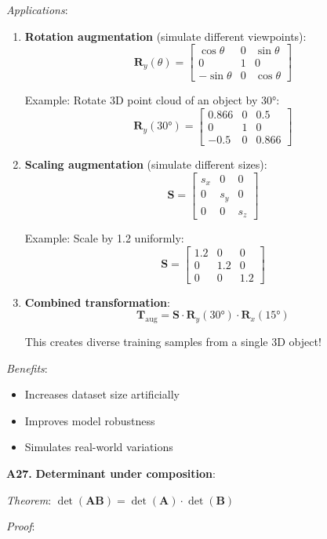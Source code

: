 \documentclass[12pt,a4paper]{article}
\theoremstyle{definition}
\begin{document}
\textit{Applications}:
\begin{enumerate}
\item \textbf{Rotation augmentation} (simulate different viewpoints):
\[
\mathbf{R}_y(\theta) = \begin{bmatrix}
\cos\theta & 0 & \sin\theta \\
0 & 1 & 0 \\
-\sin\theta & 0 & \cos\theta
\end{bmatrix}
\]

Example: Rotate 3D point cloud of an object by 30°:
\[
\mathbf{R}_y(30°) = \begin{bmatrix}
0.866 & 0 & 0.5 \\
0 & 1 & 0 \\
-0.5 & 0 & 0.866
\end{bmatrix}
\]

\item \textbf{Scaling augmentation} (simulate different sizes):
\[
\mathbf{S} = \begin{bmatrix}
s_x & 0 & 0 \\
0 & s_y & 0 \\
0 & 0 & s_z
\end{bmatrix}
\]

Example: Scale by 1.2 uniformly:
\[
\mathbf{S} = \begin{bmatrix}
1.2 & 0 & 0 \\
0 & 1.2 & 0 \\
0 & 0 & 1.2
\end{bmatrix}
\]

\item \textbf{Combined transformation}:
\[
\mathbf{T}_{\text{aug}} = \mathbf{S} \cdot \mathbf{R}_y(30°) \cdot \mathbf{R}_x(15°)
\]

This creates diverse training samples from a single 3D object!
\end{enumerate}

\textit{Benefits}:
\begin{itemize}
\item Increases dataset size artificially
\item Improves model robustness
\item Simulates real-world variations
\end{itemize}

\textbf{A27.} \textbf{Determinant under composition}:

\textit{Theorem}: $\det(\mathbf{AB}) = \det(\mathbf{A}) \cdot \det(\mathbf{B})$

\textit{Proof}:
\end{document}

